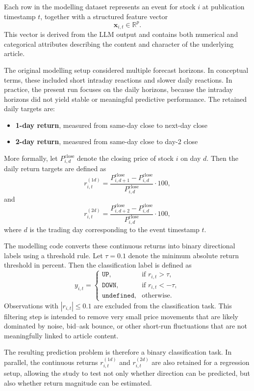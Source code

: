 Each row in the modelling dataset represents an event for stock $i$ at publication timestamp $t$, together with a structured feature vector
\[
\mathbf{x}_{i,t} \in \mathbb{R}^p.
\]
This vector is derived from the LLM output and contains both numerical and categorical attributes describing the content and character of the underlying article.

The original modelling setup considered multiple forecast horizons. In conceptual terms, these included short intraday reactions and slower daily reactions. In practice, the present run focuses on the daily horizons, because the intraday horizons did not yield stable or meaningful predictive performance. The retained daily targets are:
\begin{itemize}
    \item \textbf{1-day return}, measured from same-day close to next-day close
    \item \textbf{2-day return}, measured from same-day close to day-2 close
\end{itemize}

More formally, let $P^{\text{close}}_{i,d}$ denote the closing price of stock $i$ on day $d$. Then the daily return targets are defined as
\[
r^{(1d)}_{i,t} = \frac{P^{\text{close}}_{i,d+1} - P^{\text{close}}_{i,d}}{P^{\text{close}}_{i,d}} \cdot 100,
\]
and
\[
r^{(2d)}_{i,t} = \frac{P^{\text{close}}_{i,d+2} - P^{\text{close}}_{i,d}}{P^{\text{close}}_{i,d}} \cdot 100,
\]
where $d$ is the trading day corresponding to the event timestamp $t$.

The modelling code converts these continuous returns into binary directional labels using a threshold rule. Let $\tau = 0.1$ denote the minimum absolute return threshold in percent. Then the classification label is defined as
\[
y_{i,t} =
\begin{cases}
\texttt{UP}, & \text{if } r_{i,t} > \tau,\\[4pt]
\texttt{DOWN}, & \text{if } r_{i,t} < -\tau,\\[4pt]
\texttt{undefined}, & \text{otherwise.}
\end{cases}
\]
Observations with $|r_{i,t}| \leq 0.1$ are excluded from the classification task. This filtering step is intended to remove very small price movements that are likely dominated by noise, bid--ask bounce, or other short-run fluctuations that are not meaningfully linked to article content.

The resulting prediction problem is therefore a binary classification task. In parallel, the continuous returns $r^{(1d)}_{i,t}$ and $r^{(2d)}_{i,t}$ are also retained for a regression setup, allowing the study to test not only whether direction can be predicted, but also whether return magnitude can be estimated.


